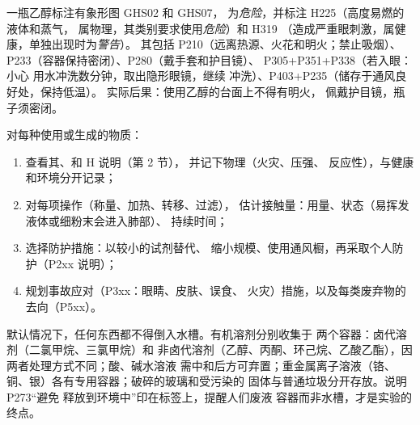 \begin{example}[读懂乙醇的标签]
一瓶乙醇标注有象形图 GHS02 和 GHS07，
为\emph{危险}，并标注 H225（高度易燃的液体和蒸气，
属物理，其类别要求使用\emph{危险}）和 H319
（造成严重眼刺激，属健康，单独出现时为\emph{警告}）。
其包括 P210（远离热源、火花和明火；禁止吸烟）、
P233（容器保持密闭）、P280（戴手套和护目镜）、
P305+P351+P338（若入眼：小心
用水冲洗数分钟，取出隐形眼镜，继续
冲洗）、P403+P235（储存于通风良好处，保持低温）。
实际后果：使用乙醇的台面上不得有明火，
佩戴护目镜，瓶子须密闭。
\end{example}

\begin{method}[根据安全技术说明书准备实验]\label{met:b1:lab-techniques-1:read-sds}
对每种使用或生成的物质：
\begin{enumerate}
  \item 查看其、和 H 说明（第 2 节），
        并记下物理（火灾、压强、
        反应性），与健康和环境分开记录；
  \item 对每项操作（称量、加热、转移、过滤），
        估计接触量：用量、状态（易挥发液体或细粉末会进入肺部）、
        持续时间；
  \item 选择防护措施：以较小的试剂替代、
        缩小规模、使用通风橱，再采取个人防护（P2xx
        说明）；
  \item 规划事故应对（P3xx：眼睛、皮肤、误食、
        火灾）措施，以及每类废弃物的去向（P5xx）。
\end{enumerate}
\end{method}

\begin{inthelab}[废弃物]
默认情况下，任何东西都不得倒入水槽。有机溶剂分别收集于
两个容器：卤代溶剂（二氯甲烷、三氯甲烷）和
非卤代溶剂（乙醇、丙酮、环己烷、乙酸乙酯），因
两者处理方式不同；酸、碱水溶液
需中和后方可弃置；重金属离子溶液（铬、
铜、银）各有专用容器；破碎的玻璃和受污染的
固体与普通垃圾分开存放。说明 P273“避免
释放到环境中”印在标签上，提醒人们废液
容器而非水槽，才是实验的终点。
\end{inthelab}

